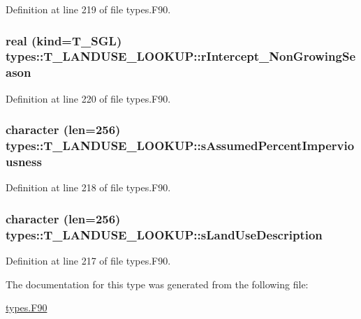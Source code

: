 Definition at line 219 of file types.F90.

\hypertarget{typetypes_1_1_t___l_a_n_d_u_s_e___l_o_o_k_u_p_adfcfbb04a59c7d4ed9c98b5de555fd9e}{
\subsubsection[{rIntercept\_\-NonGrowingSeason}]{\setlength{\rightskip}{0pt plus 5cm}real (kind={\bf T\_\-SGL}) {\bf types::T\_\-LANDUSE\_\-LOOKUP::rIntercept\_\-NonGrowingSeason}}}
\label{typetypes_1_1_t___l_a_n_d_u_s_e___l_o_o_k_u_p_adfcfbb04a59c7d4ed9c98b5de555fd9e}


Definition at line 220 of file types.F90.

\hypertarget{typetypes_1_1_t___l_a_n_d_u_s_e___l_o_o_k_u_p_ac1d94e0f8d2e258c2a9d97228701129e}{
\subsubsection[{sAssumedPercentImperviousness}]{\setlength{\rightskip}{0pt plus 5cm}character (len=256) {\bf types::T\_\-LANDUSE\_\-LOOKUP::sAssumedPercentImperviousness}}}
\label{typetypes_1_1_t___l_a_n_d_u_s_e___l_o_o_k_u_p_ac1d94e0f8d2e258c2a9d97228701129e}


Definition at line 218 of file types.F90.

\hypertarget{typetypes_1_1_t___l_a_n_d_u_s_e___l_o_o_k_u_p_a8e1c39432281c17b7b7b150acd90dea4}{
\subsubsection[{sLandUseDescription}]{\setlength{\rightskip}{0pt plus 5cm}character (len=256) {\bf types::T\_\-LANDUSE\_\-LOOKUP::sLandUseDescription}}}
\label{typetypes_1_1_t___l_a_n_d_u_s_e___l_o_o_k_u_p_a8e1c39432281c17b7b7b150acd90dea4}


Definition at line 217 of file types.F90.



The documentation for this type was generated from the following file:\begin{DoxyCompactItemize}
\item 
\hyperlink{types_8_f90}{types.F90}\end{DoxyCompactItemize}
